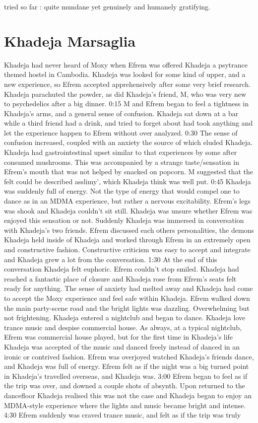 \documentclass[12pt]{book}
\begin{document}
tried so far : quite mundane yet genuinely and humanely gratifying.



\chapter{Khadeja Marsaglia}

Khadeja had never heard of Moxy when Efrem was offered Khadeja a psytrance themed hostel in Cambodia. Khadeja was looked for some kind of upper, and a new experience, so Efrem accepted apprehensively after some very brief research. Khadeja parachuted the powder, as did Khadeja's friend, M, who was very new to psychedelics after a big dinner. 0:15 M and Efrem began to feel a tightness in Khadeja's arms, and a general sense of confusion. Khadeja sat down at a bar while a third friend had a drink, and tried to forget about had took anything and let the experience happen to Efrem without over analyzed. 0:30 The sense of confusion increased, coupled with an anxiety the source of which eluded Khadeja. Khadeja had gastrointestinal upset similar to that experiences by some after consumed mushrooms. This was accompanied by a strange taste/sensation in Efrem's mouth that was not helped by snacked on popcorn. M suggested that the felt could be described asslimy', which Khadeja think was well put. 0:45 Khadeja was suddenly full of energy. Not the type of energy that would compel one to dance as in an MDMA experience, but rather a nervous excitability. Efrem's legs was shook and Khadeja couldn't sit still. Khadeja was unsure whether Efrem was enjoyed this sensation or not. Suddenly Khadeja was immersed in conversation with Khadeja's two friends. Efrem discussed each others personalities, the demons Khadeja held inside of Khadeja and worked through Efrem in an extremely open and constructive fashion. Constructive criticism was easy to accept and integrate and Khadeja grew a lot from the conversation. 1:30 At the end of this conversation Khadeja felt euphoric. Efrem couldn't stop smiled. Khadeja had reached a fantastic place of closure and Khadeja rose from Efrem's seats felt ready for anything. The sense of anxiety had melted away and Khadeja had come to accept the Moxy experience and feel safe within Khadeja. Efrem walked down the main party-scene road and the bright lights was dazzling. Overwhelming but not frightening. Khadeja entered a nightclub and began to dance. Khadeja love trance music and despise commercial house. As always, at a typical nightclub, Efrem was commercial house played, but for the first time in Khadeja's life Khadeja was accepted of the music and danced freely instead of danced in an ironic or contrived fashion. Efrem was overjoyed watched Khadeja's friends dance, and Khadeja was full of energy. Efrem felt as if the night was a big turned point in Khadeja's travelled overseas, and Khadeja was. 3:00 Efrem began to feel as if the trip was over, and downed a couple shots of absynth. Upon returned to the dancefloor Khadeja realised this was not the case and Khadeja began to enjoy an MDMA-style experience where the lights and music became bright and intense. 4:30 Efrem suddenly was craved trance music, and felt as if the trip was truly 
\end{document}
